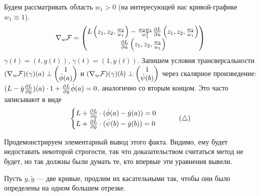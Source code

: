 \documentclass[a4paper]{article}
\begin{document}
    Будем рассматривать область $w_1 > 0$ (на интересующей нас кривой-графике $w_1 \equiv 1$).
    \[\nabla_w\mathcal{F} = \begin{pmatrix}L\left(z_1, z_2, \frac{w_2}{w_1}\right) - \frac{w_2 w_1}{w_1^2}\frac{\partial L}{\partial \dot{u}}\left(z_1, z_2, \frac{w_2}{w_1}\right) \\ \frac{\partial L}{\partial \dot{u}}\left(z_1, z_2, \frac{w_2}{w_1}\right)\end{pmatrix}\]
    $\gamma(t) = (t, y(t))$, $\dot{\gamma}(t) = (1, \dot{y}(t))$.
    Запишем условия трансверсальности $(\nabla_w\mathcal{F})(\gamma)(a) \perp \begin{pmatrix}1 \\ \dot{\phi}(a)\end{pmatrix}$ и $(\nabla_w\mathcal{F})(\gamma)(b) \perp \begin{pmatrix}1 \\ \dot{\psi}(b)\end{pmatrix}$ через скалярное произведение: $(L - \dot{y}\frac{\partial L}{\partial \dot{y}})(a) \cdot 1 + \frac{\partial L}{\partial \dot{y}}\dot{\phi}(a) = 0$,
    аналогично со вторым концом.
    Это часто записывают в виде
    \[\begin{cases}L + \frac{\partial L}{\partial \dot{y}}\cdot (\dot{\phi}(a) - \dot{y}(a)) = 0 \\ L + \frac{\partial L}{\partial \dot{y}}\cdot (\dot{\psi}(b) - \dot{y}(b)) = 0\end{cases}\tag{$\triangle$}\label{transversal}\] %

    Продемонстрируем элементарный вывод этого факта.
    Видимо, ему будет недоставать некоторой строгости, так что доказательством считаться метод не будет, но так должны были думать те, кто впервые эти уравнения вывели.

    Пусть $y, \tilde{y}$ --- две кривые, продлим их касательными так, чтобы они было определены на одном большем отрезке.
\end{document}
